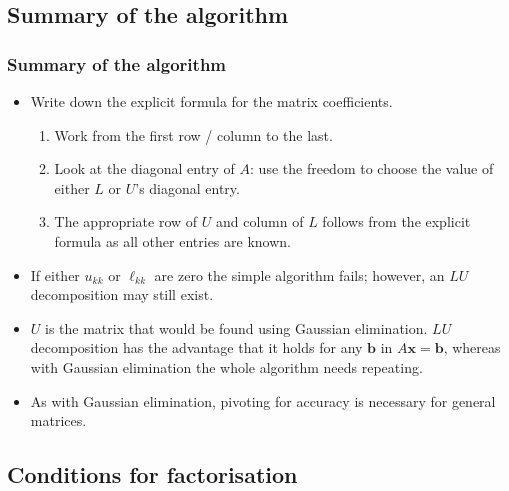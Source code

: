 \documentclass{beamer}
\newcommand{\bb}{{\boldsymbol{b}}}
\newcommand{\bx}{{\boldsymbol{x}}}
\begin{document}
\subsection{Summary of the algorithm}

\begin{frame}
  \frametitle{Summary of the algorithm}
  
  \begin{itemize}
  \item Write down the explicit formula for the matrix coefficients.
    \begin{enumerate}
    \item Work from the first row / column to the last.
    \item Look at the diagonal entry of $A$: use the freedom to choose
      the value of either $L$ or $U$'s diagonal entry.
    \item The appropriate row of $U$ and column of $L$ follows from
      the explicit formula as all other entries are known.
    \end{enumerate} \pause
  \item If either $u_{k k}$ or $\ell_{k k}$ are zero the simple
    algorithm fails; however, an $LU$ decomposition may still exist. \pause
  \item $U$ is the matrix that would be found using Gaussian
    elimination. $LU$ decomposition has the advantage that it holds
    for any $\bb$ in $A \bx = \bb$, whereas with Gaussian elimination
    the whole algorithm needs repeating. \pause
  \item As with Gaussian elimination, pivoting for accuracy is
    necessary for general matrices.
  \end{itemize}

\end{frame}


\subsection{Conditions for factorisation}
\end{document}
